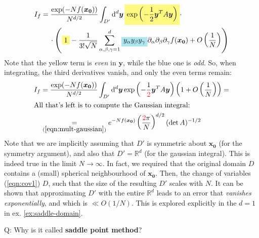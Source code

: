 \documentclass[../template.tex]{subfiles}
\begin{document}
\begin{align}\label{eqn:before1}
    I_f &= \frac{\exp(-N f(\bm{x_0}))}{N^{d/2}} \int_{D'} \dd[d]{\bm{y}} \hlc{Yellow}{\exp\left(-\frac{1}{2} \bm{y}^T A \bm{y}\right) }\cdot\\ \nonumber
    &\quad \> \cdot \left(\hlc{Yellow}{1}-\frac{1}{3! \sqrt{N}} \sum_{\alpha, \beta, \gamma=1}^d \hlc{SkyBlue}{y_\alpha y_\beta y_\gamma} \partial_\alpha \partial_\beta \partial_\gamma f(\bm{x_0}) + O\left(\frac{1}{N} \right)\right)
\end{align}
Note that the yellow term is \textit{even} in $\bm{y}$, while the blue one is \textit{odd}. So, when integrating, the third derivatives vanish, and only the even terms remain:
\begin{align} \nonumber
    I_f &= \frac{\exp(-N f(\bm{x_0}))}{N^{d/2}} \int_{D'} \dd[d]{\bm{y}} {\exp\left(-\frac{1}{\textcolor{Red}{2}} \bm{y}^T A \bm{y}\right) } \left(1+ O\left(\frac{1}{N} \right)\right) =\\
    \shortintertext{All that's left is to compute the Gaussian integral:}
    &\underset{(\ref{eqn:mult-gaussian})}{=}  e^{-N f(\bm{x_0})} \left(\frac{\textcolor{Red}{2} \pi}{N} \right)^{d/2} (\operatorname{det}A)^{-1/2} \label{eqn:result-saddle}
\end{align}
Note that we are implicitly assuming that $D'$ is symmetric about $\bm{x_0}$ (for the symmetry argument), and also that $D' = \mathbb{R}^d$ (for the gaussian integral). This is indeed true in the limit $N \to \infty$. In fact, we required that the original domain $D$ contains a (small) spherical neighbourhood of $\bm{x_0}$. Then, the change of variables (\ref{eqn:cov1})  $D$, such that the size of the resulting $D'$ scales with $N$. It can be shown that approximating $D'$ with the entire $\mathbb{R}^d$ leads to an error that \textit{vanishes exponentially}, and which is $\ll O(1/N)$. This is explored explicitly in the $d=1$ in ex. \ref{ex:saddle-domain}.

\begin{expl}
    Q: Why is it called \textbf{saddle point method}?
\end{expl}
\end{document}
